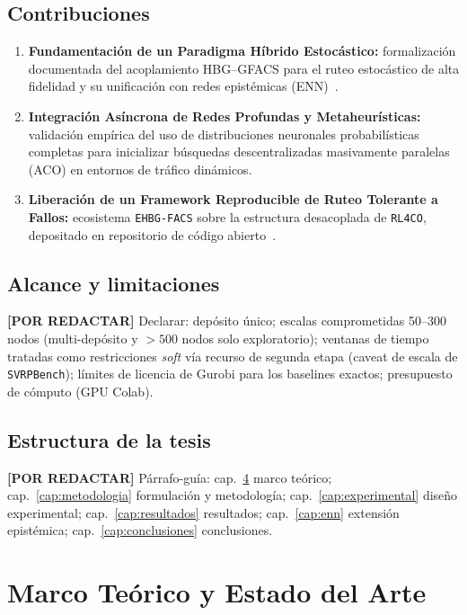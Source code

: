 \documentclass[12pt]{report}
\newcommand{\pendiente}[1]{\par\noindent\colorbox{lightbg}{%
  \begin{minipage}{0.94\linewidth}\small
  \textcolor{uanlgold}{\textbf{[POR REDACTAR]}} #1
  \end{minipage}}\par\medskip}
\begin{document}
\section{Contribuciones}\label{sec:contribuciones}
\begin{enumerate}[label=\textbf{C\arabic*.},leftmargin=1.5cm,itemsep=0.5em]
  \item \textbf{Fundamentaci\'on de un Paradigma H\'ibrido Estoc\'astico:}
  formalizaci\'on documentada del acoplamiento HBG--GFACS para el ruteo
  estoc\'astico de alta fidelidad y su unificaci\'on con redes epist\'emicas
  (ENN)~\cite{Zhang2025Hybrid, ENN_GFN_2025}.
  \item \textbf{Integraci\'on As\'incrona de Redes Profundas y
  Metaheur\'isticas:} validaci\'on emp\'irica del uso de distribuciones
  neuronales probabil\'isticas completas para inicializar b\'usquedas
  descentralizadas masivamente paralelas (ACO) en entornos de tr\'afico
  din\'amicos.
  \item \textbf{Liberaci\'on de un Framework Reproducible de Ruteo Tolerante a
  Fallos:} ecosistema \texttt{EHBG-FACS} sobre la estructura desacoplada de
  \texttt{RL4CO}, depositado en repositorio de c\'odigo
  abierto~\cite{Berto2023RL4CO}.
\end{enumerate}

\section{Alcance y limitaciones}\label{sec:alcance}
\pendiente{Declarar: dep\'osito \'unico; escalas comprometidas 50--300 nodos
(multi-dep\'osito y $>500$ nodos solo exploratorio); ventanas de tiempo tratadas
como restricciones \emph{soft} v\'ia recurso de segunda etapa (caveat de escala
de \texttt{SVRPBench}); l\'imites de licencia de Gurobi para los baselines
exactos; presupuesto de c\'omputo (GPU Colab).}

\section{Estructura de la tesis}\label{sec:estructura}
\pendiente{P\'arrafo-gu\'ia: cap.~\ref{cap:marco} marco te\'orico;
cap.~\ref{cap:metodologia} formulaci\'on y metodolog\'ia;
cap.~\ref{cap:experimental} dise\~no experimental; cap.~\ref{cap:resultados}
resultados; cap.~\ref{cap:enn} extensi\'on epist\'emica;
cap.~\ref{cap:conclusiones} conclusiones.}

\chapter{Marco Te\'orico y Estado del Arte}\label{cap:marco}
\end{document}
